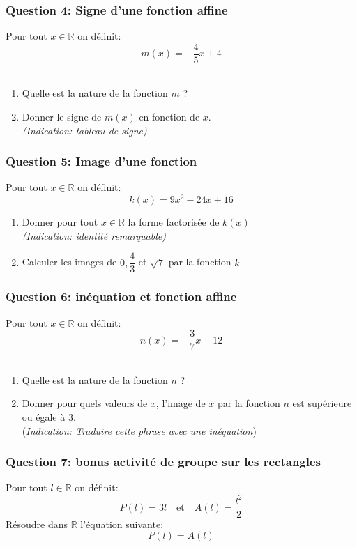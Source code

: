 \documentclass[t,12pt]{beamer}
\newcommand{\R}{\mathbb{R}}
\begin{document}
\begin{frame}
	\frametitle{Question 4: Signe d'une fonction affine }
	Pour tout  $x\in\R$ on définit: $$m(x) = -\dfrac{4}{5}x+4$$ \hfill\\[-0.2cm]
		\begin{enumerate}
		\item Quelle est la nature de la fonction $m$ ? 
		\item Donner le signe de $m(x)$ en fonction de $x$.\\ \small\textit{(Indication: tableau de signe) }
	\end{enumerate}
	

\end{frame}

\begin{frame}
	\frametitle{Question 5: Image d'une fonction}
Pour tout  $x\in\R$ on définit: $$k(x)= 9x^2 -24x + 16 $$ 
\begin{enumerate}
	\item Donner pour tout $x\in\R$ la forme factorisée de $k(x)$\\
	\small\textit{(Indication: identité remarquable) } 
	\normalsize
	\item Calculer les images de $0 , \dfrac{4}{3}$ et $\sqrt{7}$ par la fonction $k$. 
\end{enumerate}

\end{frame}


\begin{frame}
	\frametitle{Question 6: inéquation et fonction affine}
		Pour tout  $x\in\R$ on définit: $$n(x) = -\dfrac{3}{7}x-12$$ \hfill\\[-0.2cm]
	\begin{enumerate}
		\item Quelle est la nature de la fonction $n$ ? 
		\item Donner pour quels valeurs de $x$, l'image de $x$ par la fonction $n$ est supérieure ou égale à 3.\\
		\small(\textit{Indication: Traduire cette phrase avec une inéquation})
		
	\end{enumerate}
	
 

\end{frame}


\begin{frame}
	\frametitle{Question 7: bonus activité de groupe sur les rectangles}
	Pour tout  $l\in\R$ on définit: $$P(l) = 3l \quad \text{et} \quad A(l) = \dfrac{l^2}{2}$$
Résoudre dans $\R$ l'équation suivante: 
$$P(l) = A(l) $$
\end{frame}
\end{document}
